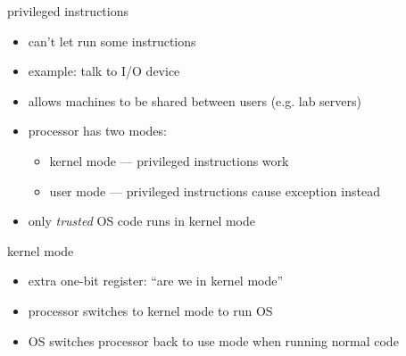 \begin{frame}{privileged instructions}
\begin{itemize}
\item can't let  run some instructions
\item example: talk to I/O device
\item allows machines to be shared between users (e.g. lab servers)
\vspace{.5cm}
\item processor has two modes:
\begin{itemize}
    \item kernel mode --- privileged instructions work
    \item user mode --- privileged instructions cause exception instead
\end{itemize}
\item only \textit{trusted} OS code runs in kernel mode
\end{itemize}
\end{frame}

\begin{frame}{kernel mode}
\begin{itemize}
\item extra one-bit register: ``are we in kernel mode''
\vspace{.5cm}
\item processor switches to kernel mode to run OS
\item OS switches processor back to use mode when running normal code
\end{itemize}
\end{frame}


